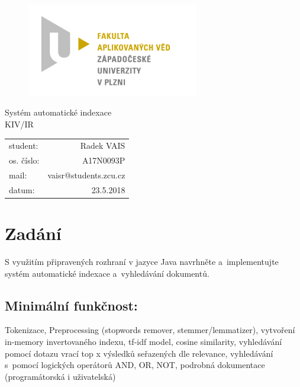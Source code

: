 \documentclass[12pt, a4paper]{article}
\begin{document}
\begin{figure}[h!]
\centering
\includegraphics[bb= 0 0 820 445 , width=75mm]{favlogo.jpg}
\end{figure}

{\centering
{\huge Systém automatické indexace}\\[1em]
{\large KIV/IR}\\[11,5cm]
}

\begin{tabular}{l r}
student: & Radek VAIS\\
os. číslo: & A17N0093P\\
mail: & vaisr@students.zcu.cz\\
datum: & 23.5.2018\\
\end{tabular}

\thispagestyle{empty}
\newpage

\section{Zadání} %

S využitím připravených rozhraní v jazyce Java navrhněte a~implementujte systém automatické indexace a~vyhledávání dokumentů.

\subsection{Minimální funkčnost:}

Tokenizace, Preprocessing (stopwords remover, stemmer/lemmatizer), vytvoření in-memory invertovaného indexu, tf-idf model, cosine similarity,  vyhledávání pomocí dotazu vrací top x výsledků seřazených dle relevance, vyhledávání s~pomocí logických operátorů AND, OR, NOT, podrobná dokumentace (programátorská i uživatelská)
\end{document}
